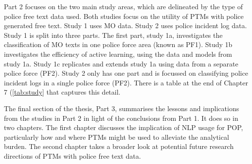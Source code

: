 Part 2 focuses on the two main study areas, which are delineated by the type of police free text data used. Both studies focus on the utility of PTMs with police generated free text. Study 1 uses MO data. Study 2 uses police incident log data. Study 1 is split into three parts. The first part, study 1a, investigates the classification of MO texts in one police force area (known as PF1). Study 1b investigates the efficiency of active learning, using the data and models from study 1a. Study 1c replicates and extends study 1a using data from a separate police force (PF2). Study 2 only has one part and is focussed on classifying police incident logs in a single police force (PF2). There is a table at the end of Chapter 7 (\ref{tab:study} that captures this detail.

The final section of the thesis, Part 3, summarises the lessons and implications from the studies in Part 2 in light of the conclusions from Part 1. It does so in two chapters. The first chapter discusses the implication of NLP usage for POP, particularly how and where PTMs might be used to alleviate the analytical burden. The second chapter takes a broader look at potential future research directions of PTMs with police free text data.




